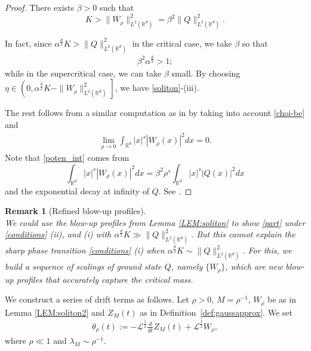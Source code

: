 \documentclass[%
11pt,  reqno]{amsart}
\theoremstyle{remarkstyle}
\newtheorem{remark}{Remark}[section]
\newcommand{\1}{\hspace{0.2mm}\text{I}\hspace{0.2mm}}
\newcommand{\noi}{\noindent}
\newcommand{\R}{\mathbb{R}}
\renewcommand{\L}{\mathcal{L}}
\newcommand{\al}{\alpha}
\newcommand{\be}{\beta}
\newcommand{\ld}{\lambda}
\numberwithin{equation}{section}
\numberwithin{theorem}{section}
\begin{document}
	
	\begin{proof}
		There exists $\be > 0$ such that 
		\[
		K > \| W_\rho \|^2_{L^2(\R^d)} = \be^2 \| Q\|^2_{L^2(\R^d)}.
		\]
		
		\noi 
		In fact, since $\al^{\frac{d}2}K > \| Q\|^2_{L^2(\R^d)}$ in the critical case, we take $\beta$ so that 
		\begin{align} \label{choi-be}
			\beta^2 \al^{\frac{d}2} >1;
		\end{align} 
		while in the supercritical case, we can take $\be$ small. By choosing $\eta \in \left(0, \al^{\frac{d}2}K - \| W_\rho \|^2_{L^2(\R^d)}\right]$, we have \eqref{soliton}-(iii).
		
		The rest follows from a similar computation as in \cite[Lemma 3.4]{LW22} by taking into account \eqref{choi-be} and
		\begin{align}
			\lim_{\rho \to 0} \int_{\R^d} |x|^s |W_\rho (x)|^2 dx = 0.   
			\label{poten_int}
		\end{align} 
		Note that \eqref{poten_int} comes from
		\[
		\int_{\R^d} |x|^s |W_\rho (x)|^2 dx  = \be^2 \rho^s \int_{\R^d} |x|^s |Q ( x)|^2 dx
		\]
		and the exponential decay at infinity of $Q$. See \cite[Proposition 3.1]{OST22}.
	\end{proof}
	
	
	
	\begin{remark}[Refined blow-up profiles]\rm \mbox{}\\
		We could use the blow-up profiles from Lemma \ref{LEM:soliton} to show \eqref{part} under \eqref{conditions} (ii), and (i) with $\al^{\frac{d}2} K \gg \| Q\|^2_{L^2(\R^d)}$. But this cannot explain the sharp phase transition \eqref{conditions} (i) when $\al^{\frac{d}2} K \sim \| Q\|^2_{L^2(\R^d)}$. For this, we build a sequence of scalings of ground state $Q$, namely $\{W_\rho\}$, which are new blow-up profiles that accurately capture the critical mass.
	\end{remark}
	
	
	\medskip
	
	We construct a series of drift terms as follows. Let $\rho >0$, $M=\rho^{-1}$, $W_\rho$ be as in Lemma \ref{LEM:soliton2} and $Z_M(t)$ as in Definition~\ref{def:gaussapprox}. We set 
	\begin{align}
		\label{theta}
		\theta_\rho (t) := -  \L^{\frac12} \frac{d}{dt} Z_M (t) +  \L^{\frac12}  W_\rho,
	\end{align}
	\noi 
	where $\rho \ll 1$ and $ \ld_M \sim \rho^{-1}$.
	
\end{document}
